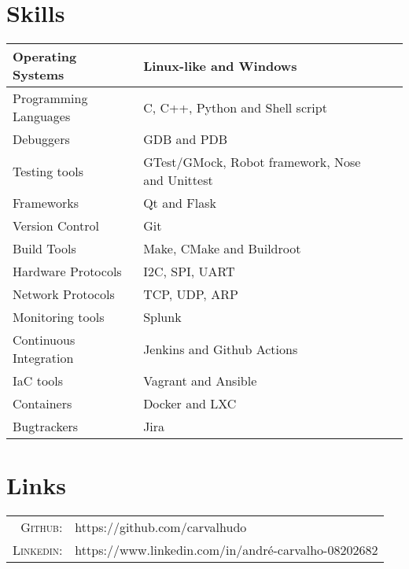 \documentclass[a4paper,10pt]{article}
\begin{document}
\section{Skills}
\begin{center}
    \begin{tabular}{| l | l | l | l |}
    \hline
    Operating Systems & Linux-like and Windows\\ \hline
    Programming Languages & C, C++, Python and Shell script\\ \hline
    Debuggers & GDB and PDB \\ \hline
    Testing tools & GTest/GMock, Robot framework, Nose and Unittest\\ \hline
    Frameworks & Qt and Flask\\ \hline
    Version Control & Git\\ \hline
    Build Tools & Make, CMake and Buildroot\\ \hline
    Hardware Protocols & I2C, SPI, UART\\ \hline
    Network Protocols & TCP, UDP, ARP\\ \hline
    Monitoring tools & Splunk\\ \hline
    Continuous Integration & Jenkins and Github Actions\\ \hline
    IaC tools & Vagrant and Ansible\\ \hline
    Containers & Docker and LXC\\ \hline
    Bugtrackers & Jira\\ \hline
    \end{tabular}
\end{center}

\section{Links}
\begin{tabular}{rl}
\textsc{Github:}& https://github.com/carvalhudo\\
\textsc{Linkedin:}&https://www.linkedin.com/in/andré-carvalho-08202682 \\
\end{tabular}
\end{document}

